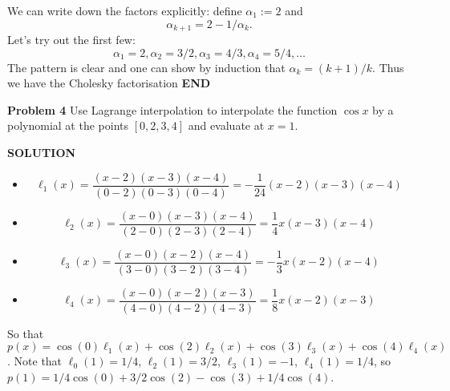 \documentclass[12pt,a4paper]{article}
\begin{document}
We can  write down the factors explicitly: define $\ensuremath{\alpha}_1 := 2$ and
\[
\ensuremath{\alpha}_{k+1} = 2- 1/\ensuremath{\alpha}_k.
\]
Let's try out the first few:
\[
\ensuremath{\alpha}_1 = 2, \ensuremath{\alpha}_2 = 3/2, \ensuremath{\alpha}_3 = 4/3, \ensuremath{\alpha}_4 = 5/4, \ensuremath{\ldots}
\]
The pattern is clear and one can show by induction that $\ensuremath{\alpha}_k = (k+1)/k$. Thus we have the Cholesky factorisation
\textbf{END}

\textbf{Problem 4} Use Lagrange interpolation to interpolate the function $\cos x$ by a polynomial at the points $[0,2,3,4]$ and evaluate at $x = 1$.

\textbf{SOLUTION}

\begin{itemize}
\item \[
\ensuremath{\ell}_1(x)=\frac{(x-2)(x-3)(x-4)}{(0-2)(0-3)(0-4)}=-\frac{1}{24}(x-2)(x-3)(x-4)
\]

\item \[
\ensuremath{\ell}_2(x)=\frac{(x-0)(x-3)(x-4)}{(2-0)(2-3)(2-4)}=\frac{1}{4}x(x-3)(x-4)
\]

\item \[
\ensuremath{\ell}_3(x)=\frac{(x-0)(x-2)(x-4)}{(3-0)(3-2)(3-4)}=-\frac{1}{3}x(x-2)(x-4)
\]

\item \[
\ensuremath{\ell}_4(x)=\frac{(x-0)(x-2)(x-3)}{(4-0)(4-2)(4-3)}=\frac{1}{8}x(x-2)(x-3)
\]
\end{itemize}
So that $p(x)=\cos(0)\ensuremath{\ell}_1(x)+\cos(2)\ensuremath{\ell}_2(x)+\cos(3)\ensuremath{\ell}_3(x)+\cos(4)\ensuremath{\ell}_4(x)$. Note that $\ensuremath{\ell}_0(1)=1/4$, $\ensuremath{\ell}_2(1)=3/2$, $\ensuremath{\ell}_3(1)=-1$, $\ensuremath{\ell}_4(1)=1/4$, so $p(1)=1/4\cos(0)+3/2\cos(2)-\cos(3)+1/4\cos(4)$.
\end{document}
